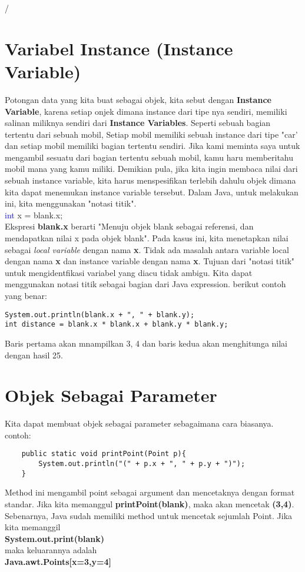 /\section{Variabel Instance (Instance Variable)}
Potongan data yang kita buat sebagai objek, kita sebut dengan \textbf{Instance Variable}, karena setiap onjek dimana instance dari tipe nya sendiri, memiliki salinan miliknya sendiri dari \textbf{Instance Variables}.
Seperti sebuah bagian tertentu dari sebuah mobil, Setiap mobil memiliki sebuah instance dari tipe "car' dan setiap mobil memiliki bagian tertentu sendiri. Jika kami meminta saya untuk mengambil sesuatu dari bagian tertentu sebuah mobil, kamu haru memberitahu mobil mana yang kamu miliki.
Demikian pula, jika kita ingin membaca nilai dari sebuah instance variable, kita harus menspesifikan terlebih dahulu objek dimana kita dapat menemukan instance variable tersebut. Dalam Java, untuk melakukan ini, kita menggunakan "notasi titik".
\\
\textcolor{blue}{int} x = blank.x;
\\
Ekspresi \textbf{blank.x} berarti "Menuju objek blank sebagai referensi, dan mendapatkan nilai x pada objek blank". Pada kasus ini, kita menetapkan nilai sebagai \textit{local variable} dengan nama \textbf{x}. Tidak ada masalah antara variable local dengan nama \textbf{x} dan instance variable dengan nama \textbf{x}. Tujuan dari "notasi titik" untuk mengidentfikasi variabel yang diacu tidak ambigu.
Kita dapat menggunakan notasi titik sebagai bagian dari Java expression. berikut contoh yang benar:

\begin{lstlisting}
System.out.println(blank.x + ", " + blank.y);
int distance = blank.x * blank.x + blank.y * blank.y;
\end{lstlisting}

Baris pertama akan mnampilkan 3, 4 dan baris kedua akan menghitunga nilai dengan hasil 25.

\section{Objek Sebagai Parameter}
Kita dapat membuat objek sebagai parameter sebagaimana cara biasanya. contoh:

\begin{lstlisting}
	public static void printPoint(Point p){
		System.out.println("(" + p.x + ", " + p.y + ")");
	}
\end{lstlisting}

Method ini mengambil point sebagai argument dan mencetaknya dengan format standar. Jika kita memanggul \textbf{printPoint(blank)}, maka akan mencetak \textbf{(3,4)}. Sebenarnya, Java sudah memiliki method untuk mencetak sejumlah Point. Jika kita memanggil\\ 
\textbf{System.out.print(blank)} \\
maka keluarannya adalah\\ \textbf{Java.awt.Points[x=3,y=4]} \\

